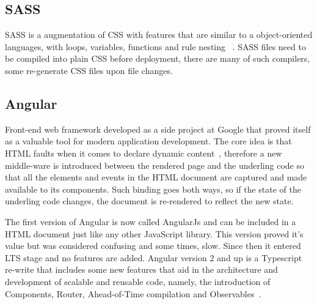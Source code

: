\subsection{SASS}
\gls{SASS} is a augmentation of CSS with features that are similar to a object-oriented languages, with loops, variables, functions and rule nesting ~\cite{sass}. SASS files need to be compiled into plain CSS before deployment, there are many of such compilers, some re-generate CSS files upon file  changes.

\subsection{Angular}\label{concept:angular}
Front-end web framework developed as a side project at Google that proved itself as a valuable tool for modern application development. The core idea is that \gls{HTML} faults when it comes to declare dynamic content~\cite{angularjs}, therefore a new middle-ware is introduced between the rendered page and the underling code so that all the elements and events in the \gls{HTML} document are captured and made available to its components. Such binding goes both ways, so if the state of the underling code changes, the document is re-rendered to reflect the new state.

The first version of Angular is now called AngularJs and can be included in a \gls{HTML} document just like any other JavaScript library. This version proved it's value but was considered confusing and some times, slow. Since then it entered \gls{LTS} stage and no features are added. Angular version 2 and up is a Typescript re-write that includes some new features that aid in the architecture and development of scalable and reusable code, namely, the introduction of Components, Router, Ahead-of-Time compilation and Observables~\cite{angular}.

